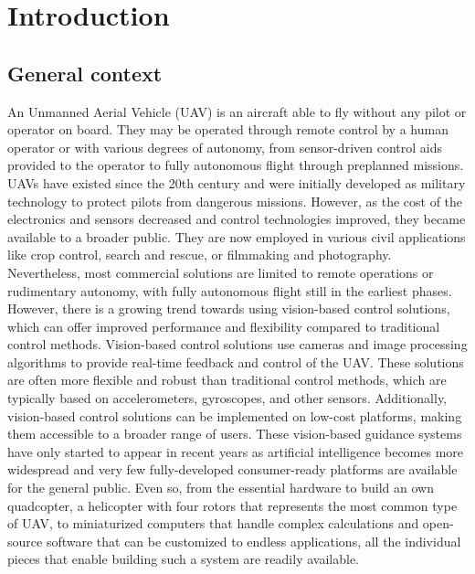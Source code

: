 \cleardoublepage
\chapter{Introduction}
\label{sec:intro}

\section{General context}

An Unmanned Aerial Vehicle (UAV) is an aircraft able to fly without any pilot or operator on board. They may be operated through remote control by a human operator or with various degrees of autonomy, from sensor-driven control aids provided to the operator to fully autonomous flight through preplanned missions.
UAVs have existed since the 20th century and were initially developed as military technology to protect pilots from dangerous missions.
However, as the cost of the electronics and sensors decreased and control technologies improved, they became available to a broader public. They are now employed in various civil applications like crop control, search and rescue, or filmmaking and photography.
Nevertheless, most commercial solutions are limited to remote operations or rudimentary autonomy, with fully autonomous flight still in the earliest phases.
However, there is a growing trend towards using vision-based control solutions, which can offer improved performance and flexibility compared to traditional control methods.
Vision-based control solutions use cameras and image processing algorithms to provide real-time feedback and control of the UAV. 
These solutions are often more flexible and robust than traditional control methods, which are typically based on accelerometers, gyroscopes, and other sensors. 
Additionally, vision-based control solutions can be implemented on low-cost platforms, making them accessible to a broader range of users.
These vision-based guidance systems have only started to appear in recent years as artificial intelligence becomes more widespread and very few fully-developed consumer-ready platforms are available for the general public.
Even so,
from the essential hardware to build an own quadcopter, a helicopter with four rotors that represents the most common type of UAV, to miniaturized computers that handle complex calculations and open-source software that can be customized to endless applications,
all the individual pieces that enable building such a system are readily available.

